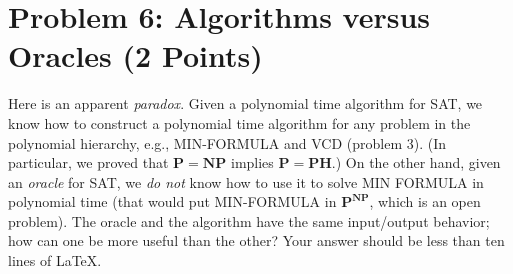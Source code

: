 \documentclass{article}
\begin{document}
\section*{Problem 6: Algorithms versus Oracles (2 Points)}

Here is an apparent {\em paradox}. Given a polynomial time algorithm for SAT, we know how to construct a polynomial time algorithm for any problem in the polynomial hierarchy, e.g., MIN-FORMULA and VCD (problem 3). (In particular, we proved that $\mathbf{P} = \mathbf{NP}$ implies $\mathbf{P} = \mathbf{PH}$.) On the other hand, given an \emph{oracle} for SAT, we \emph{do not} know how to use it to solve MIN FORMULA in polynomial time (that would put MIN-FORMULA in $\mathbf{P}^{\mathbf{NP}}$, which is an open problem). The oracle and the algorithm have the same input/output behavior; how can one be more useful than the other? Your answer should be less than ten lines of LaTeX.
\end{document}
